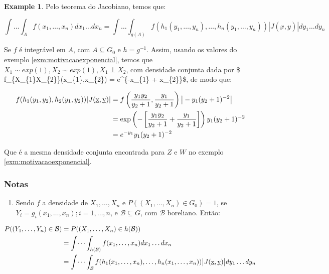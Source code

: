 \documentclass[
]{article}
\providecommand{\tightlist}{%
  \setlength{\itemsep}{0pt}\setlength{\parskip}{0pt}}
\theoremstyle{definition}
\theoremstyle{definition}
\newtheorem{example}{Example}[section]
\theoremstyle{definition}
\theoremstyle{definition}
\theoremstyle{remark}
\begin{document}
\begin{example}
Pelo teorema do Jacobiano, temos que:

\begin{equation*}
\int \ldots \int_{A}f(x_{1}, \ldots, x_{n})dx_{1} \ldots dx_{n} = \int \ldots \int_{g(A)}f(h_{1}(y_{1}, \ldots, y_{n}), \ldots , h_{n}(y_{1}, \ldots, y_{n}))|J(\underbar{x}, \underbar{y})|dy_{1} \ldots dy_{n}
\end{equation*}

Se \(f\) é integrável em \(A\), com \(A \subseteq G_{0}\) e \(h = g^{-1}\). Assim, usando os valores do exemplo \ref{exm:motivacaoexponencial}, temos que \(X_{1} \sim exp(1), X_{2} \sim exp(1), X_{1} \perp X_{2}\), com densidade conjunta dada por \$ f\_\{X\_\{1\}X\_\{2\}\}(x\_\{1\},x\_\{2\}) = e\^{}\{-x\_\{1\} + x\_\{2\}\}\$, de modo que:

\begin{align*}
f(h_{1}(y_{1},y_{2}),h_{2}(y_{1},y_{2}))|J(\underbar{x},\underbar{y})| &= f\left(\frac{y_{1}y_{2}}{y_{2} + 1},\frac{y_{1}}{y_{2} + 1}\right)\big{|}-y_{1}(y_{2} + 1)^{-2}\big{|} \\
&= \exp\left(-\left[\frac{y_{1}y_{2}}{y_{2} + 1}+\frac{y_{1}}{y_{2} + 1}\right]\right)y_{1}(y_{2} + 1)^{-2} \\
&= e^{-y_{1}}y_{1}(y_{2} + 1)^{-2}
\end{align*}

Que é a mesma densidade conjunta encontrada para \(Z\) e \(W\) no exemplo \ref{exm:motivacaoexponencial}.
\end{example}

\hypertarget{notas}{%
\subsubsection{Notas}\label{notas}}

\begin{enumerate}
\def\labelenumi{\arabic{enumi}.}
\tightlist
\item
  Sendo \(f\) a densidade de \(X_{1}, \ldots, X_{n}\) e \(P((X_{1}, \ldots, X_{n}) \in G_{0}) = 1\), se \(Y_{i} = g_{i}(x_{1}, \ldots, x_{n}); i = 1, \ldots, n\), e \(\mathcal{B} \subseteq G\), com \(\mathcal{B}\) boreliano. Então:
\end{enumerate}

\begin{align*}
P((Y_{1},\ldots,Y_{n}) \in \mathcal{B}) &= P((X_{1}, \ldots, X_{n}) \in h(\mathcal{B})) \\
&= \int \dots \int_{h(\mathcal{B})}f(x_{1},\ldots,x_{n})dx_{1} \ldots dx_{n} \\
&= \int \dots \int_{\mathcal{B}}f(h_{1}(x_{1}, \ldots, x_{n}),\ldots,h_{n}(x_{1},\ldots,x_{n}))\big{|}J(\underbar{x},\underbar{y})\big{|}dy_{1} \ldots dy_{n}
\end{align*}
\end{document}

